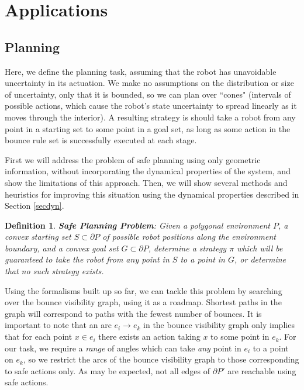 \documentclass[sageh,times,Review]{sagej}
\newtheorem{definition}{Definition}
\begin{document}
\section{Applications}

\subsection{Planning}

Here, we define the planning task, assuming that
the robot has unavoidable uncertainty in its actuation. We make no assumptions
on the distribution or size of uncertainty, only that it is bounded, so we can
plan over ``cones" (intervals of possible actions, which cause the robot's state
uncertainty to spread linearly as it moves through the interior).
A resulting strategy is should take a robot
from any point in a starting set to some point in a goal set, as long as some
action in the bounce rule set is successfully executed at each stage. 

First we will address the problem of safe planning using only geometric information, 
without incorporating the dynamical properties of the system, and show the limitations
of this approach. Then, we will show several methods and heuristics for
improving this situation using the dynamical properties described in Section
\ref{secdyn}.

\begin{definition}
\textbf{Safe Planning Problem}:
Given a polygonal environment $P$, a convex starting set $S \subset \partial P$ of possible robot positions along the
environment boundary, and a convex goal set $G \subset \partial P$, determine a strategy $\pi$ which
will be guaranteed to take the robot from any point in $S$ to a point in $G$, or
determine that no such strategy exists.
\end{definition}

Using the formalisms built up so far, we can tackle this problem by searching over
the bounce visibility graph, using it as a roadmap. Shortest paths in the graph 
will correspond to paths with the fewest number of bounces. It is important to
note that an arc $e_i \to e_k$ in the bounce visibility graph only implies that for each
point $x \in e_i$ there exists an action taking $x$ to some point in $e_k$. For
our task, we require a {\em range} of angles which can take {\em any}
point in $e_i$ to a point on $e_k$, so we restrict the arcs of the bounce
visibility graph to those corresponding to safe actions only. As may be
expected, not all edges of $\partial P'$ are reachable using safe actions.
\end{document}
